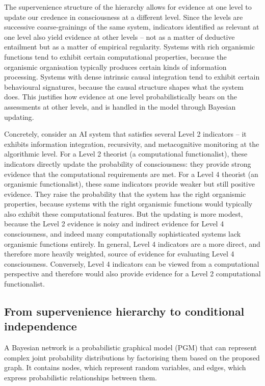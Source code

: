 \documentclass[11pt, a4paper, onecolumn, gdm]{google}
\begin{document}
The supervenience structure of the hierarchy allows for evidence at one level to update our credence in consciousness at a different level.
Since the levels are successive coarse-grainings of the same system, indicators identified as relevant at one level also yield evidence at other levels -- not as a matter of deductive entailment but as a matter of empirical regularity.
Systems with rich organismic functions tend to exhibit certain computational properties, because the organismic organisation typically produces certain kinds of information processing.
Systems with dense intrinsic causal integration tend to exhibit certain behavioural signatures, because the causal structure shapes what the system does.
This justifies how evidence at one level probabilistically bears on the assessments at other levels, and is handled in the model through Bayesian updating.

Concretely, consider an AI system that satisfies several Level 2 indicators -- it exhibits information integration, recursivity, and metacognitive monitoring at the algorithmic level.
For a Level 2 theorist (a computational functionalist), these indicators directly update the probability of consciousness: they provide strong evidence that the computational requirements are met.
For a Level 4 theorist (an organismic functionalist), these same indicators provide weaker but still positive evidence.
They raise the probability that the system has the right organismic properties, because systems with the right organismic functions would typically also exhibit these computational features.
But the updating is more modest, because the Level 2 evidence is noisy and indirect evidence for Level 4 consciousness, and indeed many computationally sophisticated systems lack organismic functions entirely.
In general, Level 4 indicators are a more direct, and therefore more heavily weighted, source of evidence for evaluating Level 4 consciousness.
Conversely, Level 4 indicators can be viewed from a computational perspective and therefore would also provide evidence for a Level 2 computational functionalist.

\subsection{From supervenience hierarchy to conditional independence}\label{from-supervenience-hierarchy-to-conditional-independence}

A Bayesian network is a probabilistic graphical model (PGM) that can represent complex joint probability distributions by factorising them based on the proposed graph.
It contains nodes, which represent random variables, and edges, which express probabilistic relationships between them.
\end{document}
